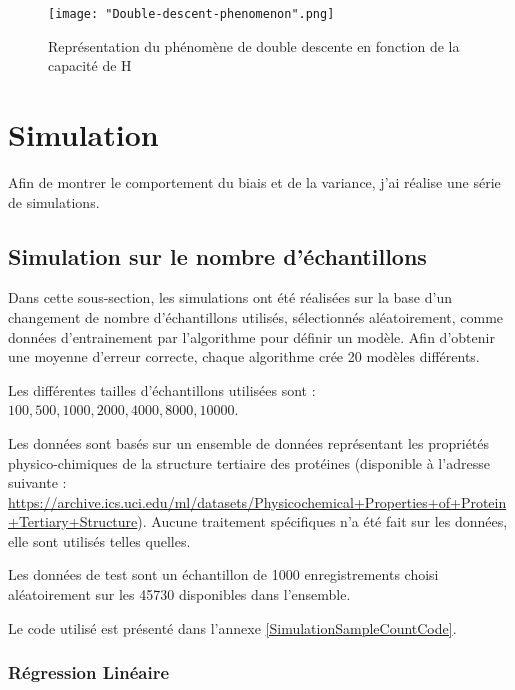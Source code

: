 \documentclass[a4paper]{article}
\begin{document}
\begin{figure}[!h]
	\centering
	\texttt{[image: "Double-descent-phenomenon".png]}
	\caption{Représentation du phénomène de double descente en fonction de la capacité de H}\cite{BiasVarianceTradeoffTextbooksUpdate}
	\label{DoubleDescentPhenomenon}
\end{figure}



\newpage

\section{Simulation}
Afin de montrer le comportement du biais et de la variance, j'ai réalise une série de simulations.

\subsection{Simulation sur le nombre d'échantillons}
Dans cette sous-section, les simulations ont été réalisées sur la base d'un changement de nombre d'échantillons utilisés, sélectionnés aléatoirement, comme données d'entrainement par l'algorithme pour définir un modèle. Afin d'obtenir une moyenne d'erreur correcte, chaque algorithme crée 20 modèles différents. \newline

Les différentes tailles d'échantillons utilisées sont : $100, 500, 1000, 2000, 4000, 8000, 10000$. \newline

Les données sont basés sur un ensemble de données représentant les propriétés physico-chimiques de la structure tertiaire des protéines (disponible à l'adresse suivante : \url{https://archive.ics.uci.edu/ml/datasets/Physicochemical+Properties+of+Protein+Tertiary+Structure}). Aucune traitement spécifiques n'a été fait sur les données, elle sont utilisés telles quelles. \newline

Les données de test sont un échantillon de 1000 enregistrements choisi aléatoirement sur les 45730 disponibles dans l'ensemble. \newline 

Le code utilisé est présenté dans l'annexe \ref{SimulationSampleCountCode}.

\newpage

\subsubsection{Régression Linéaire}
\end{document}
